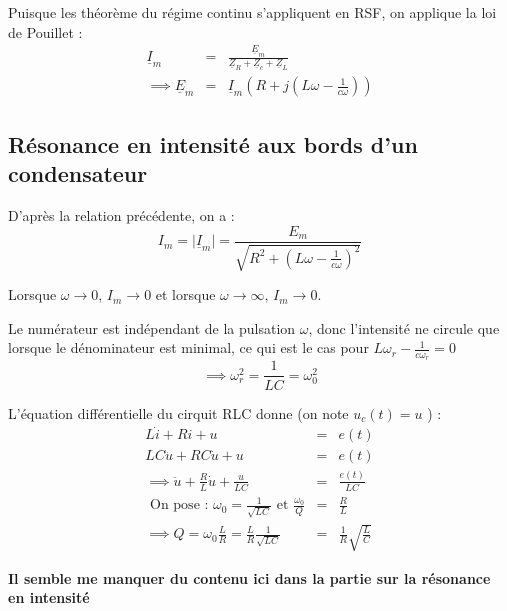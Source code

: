 Puisque les théorème du régime continu s'appliquent en RSF, on applique la loi de Pouillet : 
\begin{eqnarray*}
    \underline{I}_{m} &=& \frac{\underline{E}_{m}}{\underline{Z}_{R}+ \underline{Z}_{c} + \underline{Z}_{L}} \\
    \implies \underline{E}_{m} &=& \underline{I}_{m} \left( R + j(L \omega - \frac{1}{c \omega}) \right)
\end{eqnarray*}

\subsection{Résonance en intensité aux bords d'un condensateur }

D'après la relation précédente, on a : 
\[
    I_{m} = \lvert \underline{I}_{m} \rvert = \frac{E_{m}}{\sqrt{R^{2} + (L \omega - \frac{1}{c \omega})^{2}}} 
\]

Lorsque \(\omega \to 0\), \(I_{m} \to 0\) et lorsque \(\omega \to  \infty\), \(I_{m} \to 0\). \par
Le numérateur est indépendant de la pulsation \(\omega\), donc l'intensité ne circule que lorsque le dénominateur est minimal, ce qui est le cas pour \(L \omega_{r} - \frac{1}{c \omega_{r}} = 0 \)  
\[
    \implies \omega_{r}^{2} = \frac{1}{LC} = \omega_{\text{0}}^{2}
\]


L'équation différentielle du cirquit RLC donne (on note \(u_{c}(t) = u\) ) : 
\begin{eqnarray*}
    L \dot{i} + Ri + u &=& e(t) \\
    LC \ddot{u} + RC \dot{u} + u &=& e(t) \\
    \implies \ddot{u} + \frac{R}{L}\dot{u} + \frac{u}{LC} &=& \frac{e(t)}{LC} \\
    \text{ On pose : } \omega_{\text{0}} = \frac{1}{\sqrt{LC}}\text{ et } \frac{\omega_{\text{0}}}{Q} &=& \frac{R}{L} \\
    \implies Q = \omega_{\text{0}} \frac{L}{R} = \frac{L}{R}\frac{1}{\sqrt{LC}} &=& \frac{1}{R}\sqrt{\frac{L}{C}}
\end{eqnarray*}

\textbf{Il semble me manquer du contenu ici dans la partie sur la résonance en intensité}
